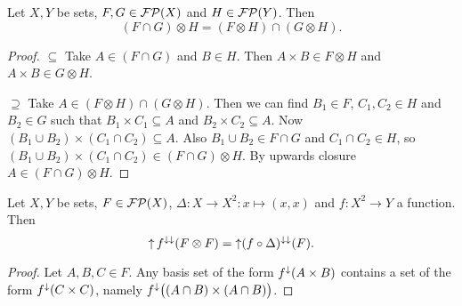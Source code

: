 \begin{lemma} \label{intersectionProductFilters}
Let $X,Y$ be sets, $F,G\in \operatorname{\mathcal{FP}}(X)$ and $H\in\operatorname{\mathcal{FP}}(Y)$. Then
\[ (F\cap G)\otimes H = (F\otimes H)\cap (G\otimes H). \]
\end{lemma}
\begin{proof}
$\boxed{\subseteq}$ Take $A\in (F\cap G)$ and $B\in H$. Then $A\times B\in F\otimes H$ and $A\times B\in G\otimes H$.

$\boxed{\supseteq}$ Take $A \in (F\otimes H)\cap (G\otimes H)$. Then we can find $B_1\in F$, $C_1,C_2\in H$ and $B_2\in G$ such that $B_1\times C_1 \subseteq A$ and $B_2\times C_2 \subseteq A$. Now $(B_1\cup B_2)\times (C_1\cap C_2) \subseteq A$. Also $B_1\cup B_2 \in F\cap G$ and $C_1\cap C_2 \in H$, so $(B_1\cup B_2)\times (C_1\cap C_2) \in (F\cap G)\otimes H$. By upwards closure $A\in (F\cap G)\otimes H$.
\end{proof}

\begin{lemma} \label{filterPairingLemma}
Let $X,Y$ be sets, $F\in\operatorname{\mathcal{FP}}(X)$, $\Delta: X\to X^2: x\mapsto (x,x)$ and $f: X^2\to Y$ a function. Then
\[ \operatorname{\uparrow} f^{\downarrow\downarrow}(F\otimes F) = \operatorname{\uparrow} (f\circ \Delta)^{\downarrow\downarrow}(F). \]
\end{lemma}
\begin{proof}
Let $A,B,C\in F$. Any basis set of the form $f^{\downarrow}(A\times B)$ contains a set of the form $f^\downarrow(C\times C)$, namely $f^{\downarrow}\big((A\cap B)\times (A\cap B)\big)$.
\end{proof}

